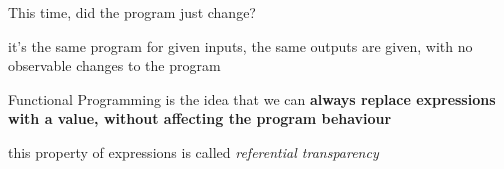 \begin{frame}
\begin{center}
This time, did the program just change?
\end{center}
\end{frame}

\begin{frame}
\begin{block}{it's the same program}
for given inputs, the same outputs are given, with no observable changes to the program
\end{block}
\end{frame}

\begin{frame}
\begin{block}{Functional Programming is the idea that}
we can \textbf{always replace expressions with a value, without affecting the program behaviour}
\end{block}
\begin{center}
\tiny{this property of expressions is called \emph{referential transparency}}
\end{center}
\end{frame}

